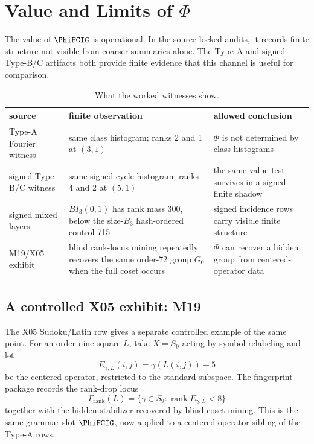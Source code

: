 \section{Value and Limits of \texorpdfstring{\(\Phi\)}{Phi}}

The value of \(\PhiFCIG\) is operational.  In the source-locked audits, it records finite structure not visible from coarser summaries alone.  The Type-A and signed Type-B/C artifacts both provide finite evidence that this channel is useful for comparison.

\begin{table}[ht]
\centering
\caption{What the worked witnesses show.}
\label{tab:phi-payoff}
\begin{tabular}{@{}L{0.25\textwidth}L{0.30\textwidth}L{0.34\textwidth}@{}}
\toprule
source & finite observation & allowed conclusion \\
\midrule
Type-A Fourier witness & same class histogram; ranks 2 and 1 at \((3,1)\) & \(\Phi\) is not determined by class histograms \\
signed Type-B/C witness & same signed-cycle histogram; ranks 4 and 2 at \((5,1)\) & the same value test survives in a signed finite shadow \\
signed mixed layers & \(BI_3(0,1)\) has rank mass 300, below the size-\(B_3\) hash-ordered control 715 & signed incidence rows carry visible finite structure \\
M19/X05 exhibit & blind rank-locus mining repeatedly recovers the same order-72 group \(G_0\) when the full coset occurs & \(\Phi\) can recover a hidden group from centered-operator data \\
\bottomrule
\end{tabular}
\end{table}

\subsection{A controlled X05 exhibit: M19}

The X05 Sudoku/Latin row gives a separate controlled example of the same point.  For an order-nine square \(L\), take \(X=S_9\) acting by symbol relabeling and let
\[
  E_{\gamma,L}(i,j)=\gamma(L(i,j))-5
\]
be the centered operator, restricted to the standard subspace.  The fingerprint package records the rank-drop locus
\[
  \Gamma_{\mathrm{rank}}(L)=\{\gamma\in S_9:\operatorname{rank}E_{\gamma,L}<8\}
\]
together with the hidden stabilizer recovered by blind coset mining.  This is the same grammar slot \(\PhiFCIG\), now applied to a centered-operator sibling of the Type-A rows.

